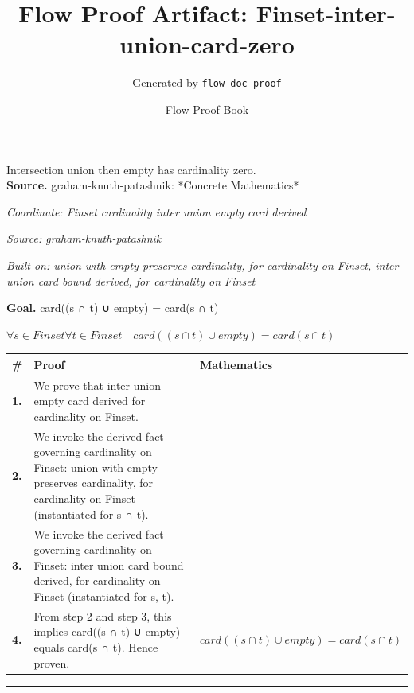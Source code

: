 \documentclass[11pt]{article}
\title{Flow Proof Artifact: Finset-inter-union-card-zero}
\author{Generated by \texttt{flow doc proof}}
\date{Flow Proof Book}
\theoremstyle{definition}
\begin{document}
\maketitle
Intersection union then empty has cardinality zero.\\[0.5em]
\textbf{Source.} graham-knuth-patashnik: *Concrete Mathematics*\\[0.5em]
\bigskip
{}\par
\smallskip\noindent\textit{Coordinate: Finset \cdot cardinality \cdot inter union empty card derived}\par
\smallskip\noindent\textit{Source: graham-knuth-patashnik}\par
\smallskip\noindent\textit{Built on: union with empty preserves cardinality, for cardinality on Finset, inter union card bound derived, for cardinality on Finset}\par
\medskip
\noindent\textbf{Goal.} card((s ∩ t) ∪ empty) = card(s ∩ t)\par
\noindent$\displaystyle \forall s \in Finset \forall t \in Finset\quad card((s ∩ t) ∪ empty) = card(s ∩ t)$\par
\medskip
\noindent
\begin{tabular}{@{} >{\raggedright\arraybackslash}p{} >{\raggedright\arraybackslash}p{} >{\raggedleft\arraybackslash}p{} @{}}
\textbf{\#} & \textbf{Proof} & \textbf{Mathematics} \\
\midrule
\textbf{1.} & We prove that inter union empty card derived for cardinality on Finset. & \\[0.45em]
\textbf{2.} & We invoke the derived fact governing cardinality on Finset: union with empty preserves cardinality, for cardinality on Finset (instantiated for s ∩ t). & \\[0.45em]
\textbf{3.} & We invoke the derived fact governing cardinality on Finset: inter union card bound derived, for cardinality on Finset (instantiated for s, t). & \\[0.45em]
\textbf{4.} & From step 2 and step 3, this implies card((s ∩ t) ∪ empty) equals card(s ∩ t). Hence proven. & $\displaystyle card((s ∩ t) ∪ empty) = card(s ∩ t)$ \\[0.45em]
\bottomrule
\end{tabular}
\label{thm:Finset-cardinality-inter_union_empty_card_derived}
\par\medskip\hrule
\end{document}
